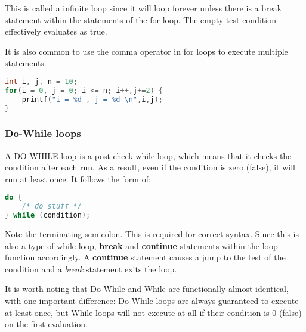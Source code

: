 This is called a infinite loop since it will loop forever unless there is a
break statement within the statements of the for loop. The empty test condition
effectively evaluates as true.

It is also common to use the comma operator in for loops to execute multiple
statements. 
\lstset{basicstyle=\scriptsize, numbers=left, captionpos=b, tabsize=4}
\begin{lstlisting}[caption=Section \thesection listing \arabic{controlcnt},language={C},
breaklines=true,xleftmargin=15pt, label=lst:section\thesection listing\arabic{controlcnt}]
int i, j, n = 10;
for(i = 0, j = 0; i <= n; i++,j+=2) {
	printf("i = %d , j = %d \n",i,j);
}
\end{lstlisting}

\subsubsection{Do-While loops}
A DO-WHILE loop is a post-check while loop, which means that it checks the
condition after each run. As a result, even if the condition is zero (false),
it will run at least once. It follows the form of:
\lstset{basicstyle=\scriptsize, numbers=left, captionpos=b, tabsize=4}
\begin{lstlisting}[caption=Section \thesection listing \arabic{controlcnt},language={C},
breaklines=true,xleftmargin=15pt, label=lst:section\thesection listing\arabic{controlcnt}]
do {
	/* do stuff */
} while (condition);
\end{lstlisting}

Note the terminating semicolon. This is required for correct syntax. Since this
is also a type of while loop, \textbf{break} and \textbf{continue} statements
within the loop function accordingly. A \textbf{continue} statement causes a
jump to the test of the condition and a \emph{break} statement exits the loop.

It is worth noting that Do-While and While are functionally almost identical,
with one important difference: Do-While loops are always guaranteed to execute
at least once, but While loops will not execute at all if their condition is 0
(false) on the first evaluation.

